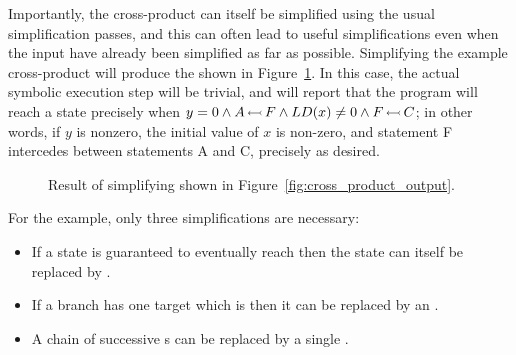 
 Importantly, the cross-product
     {\StateMachine} can itself be simplified using the usual
     {\StateMachine} simplification passes, and this can often lead to
     useful simplifications even when the input {\StateMachines} have
     already been simplified as far as possible.  Simplifying the
     example cross-product {\StateMachine} will produce the
     {\StateMachine} shown in
     Figure~\ref{fig:cross_product_output_opt}.  In this case, the
     actual symbolic execution step will be trivial, and will report
     that the program will reach a {\stCrash} state precisely when
     $y = 0 \wedge A\,{\leftarrowtail}\,F \wedge LD(x) \not= 0 \wedge
     F\,{\leftarrowtail}\,C$; in other words, if $y$ is nonzero, the
     initial value of $x$ is non-zero, and statement F intercedes
     between statements A and C, precisely as desired.

\begin{figure}
  \begin{centering}
  \end{centering}
  \caption{Result of simplifying {\StateMachine} shown in
    Figure~\ref{fig:cross_product_output}.}
  \label{fig:cross_product_output_opt}
\end{figure}

For the example, only three simplifications are necessary:

\begin{itemize}
\item If a state is guaranteed to eventually reach {\stUnreached}
  then the state can itself be replaced by {\stUnreached}.
\item If a branch has one target which is {\stUnreached} then
  it can be replaced by an .
\item A chain of successive s can be replaced by a
  single .
\end{itemize}

